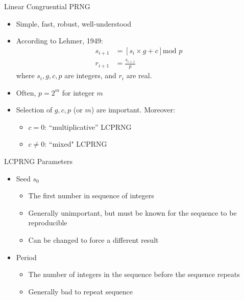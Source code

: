\documentclass[xcolor=x11names,compress]{beamer}
\renewcommand{\(}{\begin{columns}}
\renewcommand{\)}{\end{columns}}
\newcommand{\<}[1]{\begin{column}{#1}}
\renewcommand{\>}{\end{column}}
\begin{document}
\begin{frame}{Linear Congruential PRNG}
\begin{itemize}
\item Simple, fast, robust, well-understood
\item According to Lehmer, 1949:
\begin{align*}
s_{i+1}&=[s_i \times g +c] \text{mod } p\\
r_{i+1}&=\frac{s_{i+1}}{p}
\end{align*}
where  $s_i, g, c, p$ are integers, and $r_i$ are real.
\item Often, $p=2^m$ for integer $m$
\item Selection of $g, c, p$ (or $m$) are important. Moreover:
\begin{itemize}
\item $c=0$: ``multiplicative'' LCPRNG
\item $c\neq 0$: ``mixed" LCPRNG 
\end{itemize}
\end{itemize}  	
\end{frame}

\begin{frame}{LCPRNG Parameters}
\begin{itemize}
\item Seed $s_0$
\begin{itemize}
\item The first number in sequence of integers
\item Generally unimportant, but must be known for the sequence to be reproducible
\item Can be changed to force a different result
\end{itemize}
\item Period
\begin{itemize}
\item The number of integers in the sequence before the sequence repeats
\item Generally bad to repeat sequence
\end{itemize}
\end{itemize}  	
\end{frame}
\end{document}
